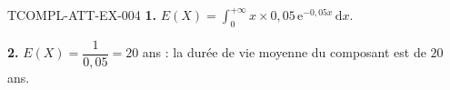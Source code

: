 \begin{corrige}{TCOMPL-ATT-EX-004}
\textbf{1.} $E(X) = \displaystyle\int_0^{+\infty} x\times0{,}05\,\mathrm{e}^{-0{,}05x}\,\mathrm{d}x$.

\textbf{2.} $E(X) = \dfrac{1}{0{,}05} = 20$ ans : la durée de vie moyenne du composant est de $20$ ans.
\end{corrige}
